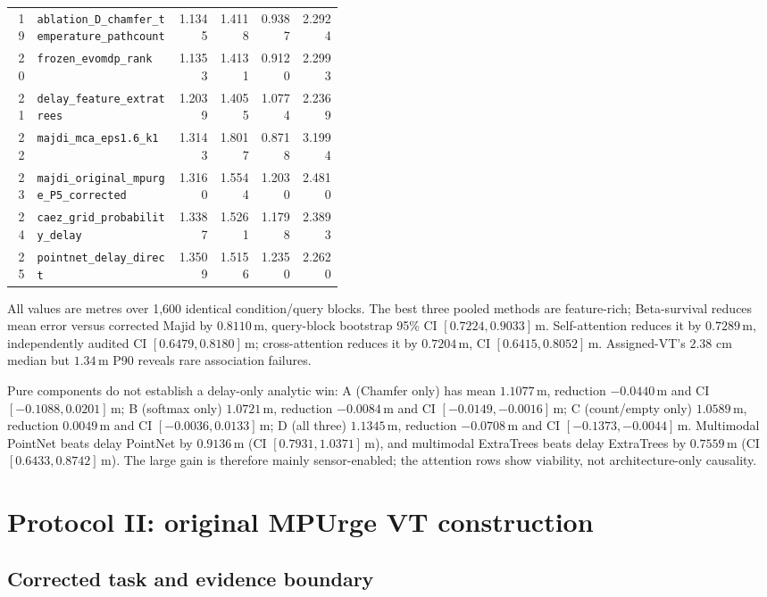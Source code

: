 \documentclass[10pt]{article}
\newcommand{\code}[1]{\nolinkurl{#1}}
\newcommand{\m}{\,\mathrm m}
\begin{document}
\begin{longtable}{@{}r p{0.43\linewidth}rrrr@{}}
19 & \code{ablation_D_chamfer_temperature_pathcount} & 1.1345 & 1.4118 & 0.9387 & 2.2924\\
20 & \code{frozen_evomdp_rank} & 1.1353 & 1.4131 & 0.9120 & 2.2993\\
21 & \code{delay_feature_extratrees} & 1.2039 & 1.4055 & 1.0774 & 2.2369\\
22 & \code{majdi_mca_eps1.6_k1} & 1.3143 & 1.8017 & 0.8718 & 3.1994\\
23 & \code{majdi_original_mpurge_P5_corrected} & 1.3160 & 1.5544 & 1.2030 & 2.4810\\
24 & \code{caez_grid_probability_delay} & 1.3387 & 1.5261 & 1.1798 & 2.3893\\
25 & \code{pointnet_delay_direct} & 1.3509 & 1.5156 & 1.2350 & 2.2620\\
\bottomrule
\end{longtable}
\normalsize

All values are metres over 1,600 identical condition/query blocks.  The best
three pooled methods are feature-rich; Beta-survival reduces mean error versus
corrected Majid by $0.8110\m$, query-block bootstrap 95\% CI
$[0.7224,0.9033]\m$.  Self-attention reduces it by $0.7289\m$, independently
audited CI $[0.6479,0.8180]\m$; cross-attention reduces it by $0.7204\m$, CI
$[0.6415,0.8052]\m$.  Assigned-VT's $2.38$ cm median but $1.34\m$ P90 reveals
rare association failures.

Pure components do not establish a delay-only analytic win: A (Chamfer only)
has mean $1.1077\m$, reduction $-0.0440\m$ and CI
$[-0.1088,0.0201]\m$; B (softmax only) $1.0721\m$, reduction
$-0.0084\m$ and CI $[-0.0149,-0.0016]\m$; C (count/empty only)
$1.0589\m$, reduction $0.0049\m$ and CI $[-0.0036,0.0133]\m$; D (all three)
$1.1345\m$, reduction $-0.0708\m$ and CI $[-0.1373,-0.0044]\m$.
Multimodal PointNet beats delay PointNet by $0.9136\m$ (CI
$[0.7931,1.0371]\m$), and multimodal ExtraTrees beats delay ExtraTrees by
$0.7559\m$ (CI $[0.6433,0.8742]\m$).  The large gain is therefore mainly
sensor-enabled; the attention rows show viability, not architecture-only
causality.

\section{Protocol II: original MPUrge VT construction}

\subsection{Corrected task and evidence boundary}
\end{document}

